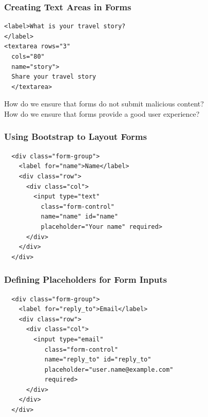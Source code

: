 \documentclass[14pt,aspectratio=169]{beamer}
\begin{document}
%
\begin{frame}[fragile]
  \frametitle{Creating Text Areas in Forms}
  \normalsize
  \begin{minipage}{6in}
    \vspace*{.1in}
    \begin{verbatim}
<label>What is your travel story?
</label>
<textarea rows="3"
  cols="80"
  name="story">
  Share your travel story
  </textarea>
    \end{verbatim}
  \end{minipage}
  \vspace*{.05in}
  \begin{center}
    \noindent How do we ensure that forms do not submit malicious content? \\
    \noindent How do we ensure that forms provide a good user experience? \\
  \end{center}
\end{frame}

%
\begin{frame}[fragile]
  \frametitle{Using Bootstrap to Layout Forms}
  \normalsize
  \begin{minipage}{6in}
    \vspace*{.1in}
    \begin{verbatim}
  <div class="form-group">
    <label for="name">Name</label>
    <div class="row">
      <div class="col">
        <input type="text"
          class="form-control"
          name="name" id="name"
          placeholder="Your name" required>
      </div>
    </div>
  </div>
    \end{verbatim}
  \end{minipage}
\end{frame}

%
\begin{frame}[fragile]
  \frametitle{Defining Placeholders for Form Inputs}
  \normalsize
  \begin{minipage}{6in}
    \vspace*{.1in}
    \begin{verbatim}
  <div class="form-group">
    <label for="reply_to">Email</label>
    <div class="row">
      <div class="col">
        <input type="email"
           class="form-control"
           name="reply_to" id="reply_to"
           placeholder="user.name@example.com"
           required>
      </div>
    </div>
  </div>
    \end{verbatim}
  \end{minipage}
\end{frame}
\end{document}
